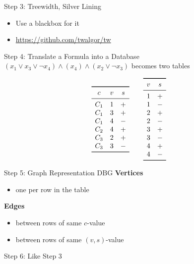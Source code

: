 \documentclass[]{beamer}
\newcommand{\DBG}{\mathrm{DBG}}
\begin{document}
\begin{frame}{Step 3: Treewidth, Silver Lining}
\begin{itemize}
	\item Use a blackbox for it
	\item \url{https://github.com/twalgor/tw}
\end{itemize}
\end{frame}

\begin{frame}{Step 4: Translate a Formula into a Database}
$(x_1\lor x_3\lor \lnot x_4)\land (x_4)\land (x_2\lor \lnot x_3)$ becomes two tables

$$\begin{array}{ccc}\toprule
		c & v & s \\\midrule
		C_1 & 1 & +\\
		C_1 & 3 & +\\
		C_1 & 4 &-\\
		C_2 & 4 &+\\
		C_3 & 2 &+\\
		C_3 & 3 &-\\\bottomrule
\end{array}\qquad
\begin{array}{cc}\toprule
		v & s \\\midrule
		1 &+\\
		1 &-\\
		2 &+\\
		2 &-\\
		3 &+\\
		3 &-\\
		4 &+\\
		4 &-	\\\bottomrule
\end{array}
$$

\end{frame}

\begin{frame}{Step 5: Graph Representation $\DBG$}
\textbf{Vertices}
\begin{itemize}
	\item one per row in the table
\end{itemize}\bigskip

\textbf{Edges}
\begin{itemize}
	\item between rows of same $c$-value
	\item between rows of same $(v,s)$-value
\end{itemize}

\alert{Step 6:} Like Step 3
\end{frame}
\end{document}
